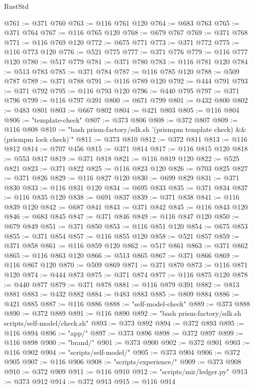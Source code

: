 \begin{lexlean}{RustStd}
\begin{coremodule}
@761 := @371 @760
@763 := @116 @761 @120
@764 := @683 @763
@765 := @371 @764
@767 := @116 @765 @120
@768 := @679 @767
@769 := @371 @768
@771 := @116 @769 @120
@772 := @675 @771
@773 := @371 @772
@775 := @116 @773 @120
@776 := @521 @775
@777 := @371 @776
@779 := @116 @777 @120
@780 := @517 @779
@781 := @371 @780
@783 := @116 @781 @120
@784 := @513 @783
@785 := @371 @784
@787 := @116 @785 @120
@788 := @509 @787
@789 := @371 @788
@791 := @116 @789 @120
@792 := @444 @791
@793 := @371 @792
@795 := @116 @793 @120
@796 := @440 @795
@797 := @371 @796
@799 := @116 @797 @391
@800 := @671 @799
@801 := @432 @800
@802 := @483 @801
@803 := @667 @802
@804 := @421 @803
@805 := @116 @804
@806 := "template-check"
@807 := @373 @806
@808 := @372 @807
@809 := @116 @808
@810 := "bash prism-factory/sdk.sh '(prismpm template check) && (prismpm lock check)'"
@811 := @373 @810
@812 := @372 @811
@813 := @116 @812
@814 := @707 @456
@815 := @371 @814
@817 := @116 @815 @120
@818 := @553 @817
@819 := @371 @818
@821 := @116 @819 @120
@822 := @525 @821
@823 := @371 @822
@825 := @116 @823 @120
@826 := @703 @825
@827 := @371 @826
@829 := @116 @827 @120
@830 := @699 @829
@831 := @371 @830
@833 := @116 @831 @120
@834 := @695 @833
@835 := @371 @834
@837 := @116 @835 @120
@838 := @691 @837
@839 := @371 @838
@841 := @116 @839 @120
@842 := @687 @841
@843 := @371 @842
@845 := @116 @843 @120
@846 := @683 @845
@847 := @371 @846
@849 := @116 @847 @120
@850 := @679 @849
@851 := @371 @850
@853 := @116 @851 @120
@854 := @675 @853
@855 := @371 @854
@857 := @116 @855 @120
@858 := @521 @857
@859 := @371 @858
@861 := @116 @859 @120
@862 := @517 @861
@863 := @371 @862
@865 := @116 @863 @120
@866 := @513 @865
@867 := @371 @866
@869 := @116 @867 @120
@870 := @509 @869
@871 := @371 @870
@873 := @116 @871 @120
@874 := @444 @873
@875 := @371 @874
@877 := @116 @875 @120
@878 := @440 @877
@879 := @371 @878
@881 := @116 @879 @391
@882 := @813 @881
@883 := @432 @882
@884 := @483 @883
@885 := @809 @884
@886 := @421 @885
@887 := @116 @886
@888 := "self-model-check"
@889 := @373 @888
@890 := @372 @889
@891 := @116 @890
@892 := "bash prism-factory/sdk.sh scripts/self-model/check.sh"
@893 := @373 @892
@894 := @372 @893
@895 := @116 @894
@896 := "app/"
@897 := @373 @896
@898 := @372 @897
@899 := @116 @898
@900 := "brand/"
@901 := @373 @900
@902 := @372 @901
@903 := @116 @902
@904 := "scripts/self-model/"
@905 := @373 @904
@906 := @372 @905
@907 := @116 @906
@908 := "scripts/experience/"
@909 := @373 @908
@910 := @372 @909
@911 := @116 @910
@912 := "scripts/mir/ledger.py"
@913 := @373 @912
@914 := @372 @913
@915 := @116 @914

\end{coremodule}
\end{lexlean}
